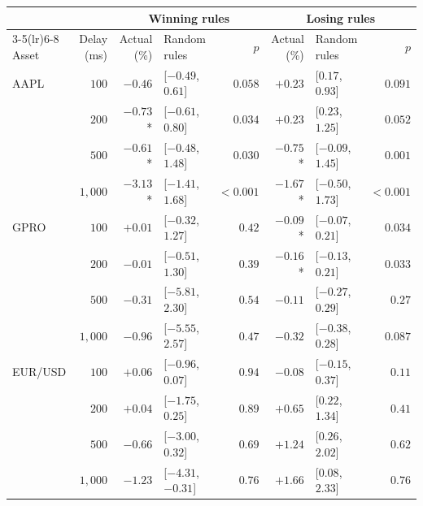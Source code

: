 \begin{tabular}{lrrlrrlr}
\toprule
 & & \multicolumn{3}{c}{Winning rules} & \multicolumn{3}{c}{Losing rules} \\
\cmidrule(lr){3-5}\cmidrule(lr){6-8}
Asset & Delay (ms) & Actual (\%) & Random rules & $p$ & Actual (\%) & Random rules & $p$ \\
\midrule
AAPL & $100$ & $-0.46$ & [$-0.49$, $0.61$] & $0.058$ & $+0.23$ & [$0.17$, $0.93$] & $0.091$ \\
 & $200$ & $-0.73$* & [$-0.61$, $0.80$] & $0.034$ & $+0.23$ & [$0.23$, $1.25$] & $0.052$ \\
 & $500$ & $-0.61$* & [$-0.48$, $1.48$] & $0.030$ & $-0.75$* & [$-0.09$, $1.45$] & $0.001$ \\
 & $1{,}000$ & $-3.13$* & [$-1.41$, $1.68$] & $<0.001$ & $-1.67$* & [$-0.50$, $1.73$] & $<0.001$ \\
\midrule
GPRO & $100$ & $+0.01$ & [$-0.32$, $1.27$] & $0.42$ & $-0.09$* & [$-0.07$, $0.21$] & $0.034$ \\
 & $200$ & $-0.01$ & [$-0.51$, $1.30$] & $0.39$ & $-0.16$* & [$-0.13$, $0.21$] & $0.033$ \\
 & $500$ & $-0.31$ & [$-5.81$, $2.30$] & $0.54$ & $-0.11$ & [$-0.27$, $0.29$] & $0.27$ \\
 & $1{,}000$ & $-0.96$ & [$-5.55$, $2.57$] & $0.47$ & $-0.32$ & [$-0.38$, $0.28$] & $0.087$ \\
\midrule
EUR/USD & $100$ & $+0.06$ & [$-0.96$, $0.07$] & $0.94$ & $-0.08$ & [$-0.15$, $0.37$] & $0.11$ \\
 & $200$ & $+0.04$ & [$-1.75$, $0.25$] & $0.89$ & $+0.65$ & [$0.22$, $1.34$] & $0.41$ \\
 & $500$ & $-0.66$ & [$-3.00$, $0.32$] & $0.69$ & $+1.24$ & [$0.26$, $2.02$] & $0.62$ \\
 & $1{,}000$ & $-1.23$ & [$-4.31$, $-0.31$] & $0.76$ & $+1.66$ & [$0.08$, $2.33$] & $0.76$ \\
\bottomrule
\end{tabular}
